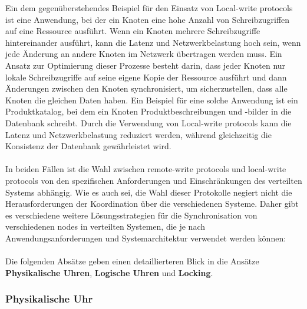 \documentclass[../vs-script-first-v01.tex]{subfiles}
\begin{document}
Ein dem gegenüberstehendes Beispiel für den Einsatz von Local-write protocols ist eine Anwendung, bei der ein Knoten eine hohe Anzahl von Schreibzugriffen auf eine Ressource ausführt. Wenn ein Knoten mehrere Schreibzugriffe hintereinander ausführt, kann die Latenz und Netzwerkbelastung hoch sein, wenn jede Änderung an andere Knoten im Netzwerk übertragen werden muss. Ein Ansatz zur Optimierung dieser Prozesse besteht darin, dass jeder Knoten nur lokale Schreibzugriffe auf seine eigene Kopie der Ressource ausführt und dann Änderungen zwischen den Knoten synchronisiert, um sicherzustellen, dass alle Knoten die gleichen Daten haben. Ein Beispiel für eine solche Anwendung ist ein Produktkatalog, bei dem ein Knoten Produktbeschreibungen und -bilder in die Datenbank schreibt. Durch die Verwendung von Local-write protocols kann die Latenz und Netzwerkbelastung reduziert werden, während gleichzeitig die Konsistenz der Datenbank gewährleistet wird.
\\\\
In beiden Fällen ist die Wahl zwischen remote-write protocols und local-write protocols von den spezifischen Anforderungen und Einschränkungen des verteilten Systems abhängig. Wie es auch sei, die Wahl dieser Protokolle negiert nicht die Herausforderungen der Koordination über die verschiedenen Systeme. Daher gibt es verschiedene weitere Lösungsstrategien für die Synchronisation von verschiedenen nodes in verteilten Systemen, die je nach Anwendungsanforderungen und Systemarchitektur verwendet werden können:
\\\\
Die folgenden Absätze geben einen detaillierteren Blick in die Ansätze \textbf{Physikalische Uhren}, \textbf{Logische Uhren} und \textbf{Locking}. 

\subsubsection{Physikalische Uhr}
\end{document}
